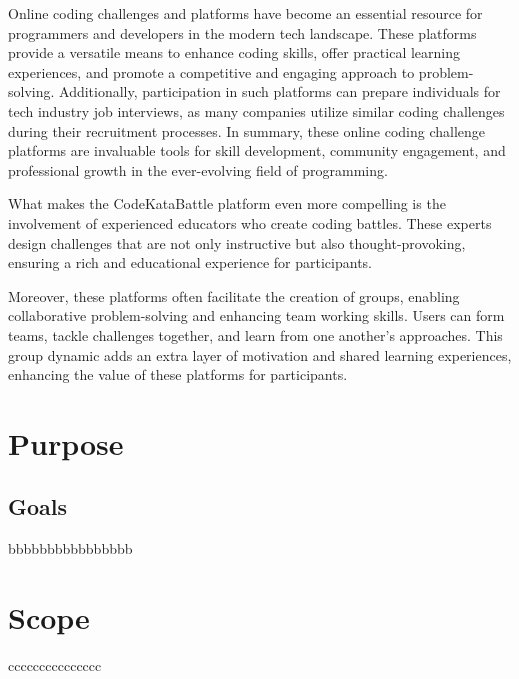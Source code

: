 Online coding challenges and platforms have become an essential resource for programmers and developers in the modern tech landscape. These platforms provide a versatile means to enhance coding skills, offer practical learning experiences, and promote a competitive and engaging approach to problem-solving. Additionally, participation in such platforms can prepare individuals for tech industry job interviews, as many companies utilize similar coding challenges during their recruitment processes. 
In summary, these online coding challenge platforms are invaluable tools for skill development, community engagement, and professional growth in the ever-evolving field of programming.

What makes the CodeKataBattle platform even more compelling is the involvement of experienced educators who create coding battles. These experts design challenges that are not only instructive but also thought-provoking, ensuring a rich and educational experience for participants.

Moreover, these platforms often facilitate the creation of groups, enabling collaborative problem-solving and enhancing team working skills. Users can form teams, tackle challenges together, and learn from one another's approaches. This group dynamic adds an extra layer of motivation and shared learning experiences, enhancing the value of these platforms for participants.

\newpage

\section{Purpose}
\label{sec:purpose}%

\subsection{Goals}
\label{subsec:goals}%
bbbbbbbbbbbbbbbb

\section{Scope}
\label{sec:scope}%
ccccccccccccccc

